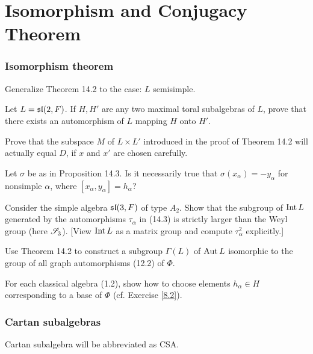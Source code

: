 \part{Isomorphism and Conjugacy Theorem}
\section{Isomorphism theorem}

\begin{ex}
  Generalize Theorem 14.2 to the case: $L$ semisimple.
\end{ex}

\begin{ex}
  Let $L = \sl(2, F)$. If $H,H'$ are any two maximal toral subalgebras of $L$, prove that there exists an automorphism of $L$ mapping $H$ onto $H'$.
\end{ex}

\begin{ex}
  Prove that the subspace $M$ of $L \times L'$ introduced in the proof of Theorem 14.2 will actually equal $D$, if $x$ and $x'$ are chosen carefully.
\end{ex}

\begin{ex}
  Let $\sigma$ be as in Proposition 14.3. Is it necessarily true that $\sigma(x_{\alpha}) = -y_{\alpha}$ for nonsimple $\alpha$, where $[x_{\alpha},y_{\alpha}] = h_{\alpha}$?
\end{ex}

\begin{ex}
  Consider the simple algebra $\sl(3,F)$ of type $A_2$. Show that the subgroup of $\Int L$ generated by the automorphisms $\tau_{\alpha}$ in (14.3) is strictly larger than the Weyl group (here $\Sss_3$). [View $\Int L$ as a matrix group and compute $\tau_{\alpha}^2$ explicitly.]
\end{ex}

\begin{ex}
  Use Theorem 14.2 to construct a subgroup $\Gamma(L)$ of $\Aut L$ isomorphic to the group of all graph automorphisms (12.2) of $\Phi$.
\end{ex}

\begin{ex}
  For each classical algebra (1.2), show how to choose elements $h_{\alpha}\in H$ corresponding to a base of $\Phi$ (cf. Exercise \ref{8.2}).
\end{ex}

\section{Cartan subalgebras}
Cartan subalgebra will be abbreviated as CSA.

